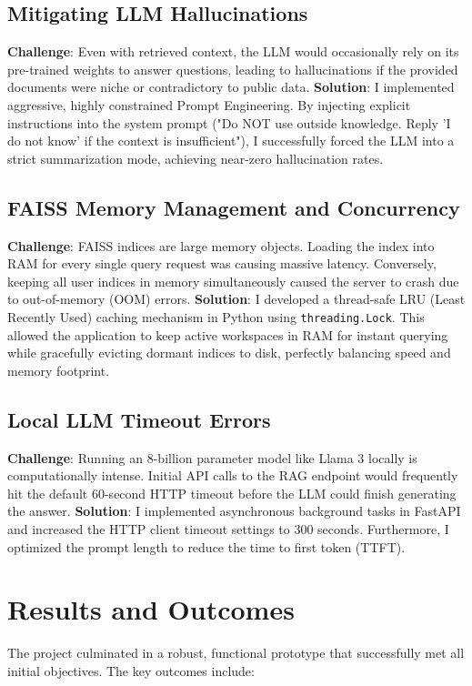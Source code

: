 \documentclass[12pt, a4paper]{report}
\begin{document}
\section{Mitigating LLM Hallucinations}
\textbf{Challenge}: Even with retrieved context, the LLM would occasionally rely on its pre-trained weights to answer questions, leading to hallucinations if the provided documents were niche or contradictory to public data.
\textbf{Solution}: I implemented aggressive, highly constrained Prompt Engineering. By injecting explicit instructions into the system prompt ("Do NOT use outside knowledge. Reply 'I do not know' if the context is insufficient"), I successfully forced the LLM into a strict summarization mode, achieving near-zero hallucination rates.

\section{FAISS Memory Management and Concurrency}
\textbf{Challenge}: FAISS indices are large memory objects. Loading the index into RAM for every single query request was causing massive latency. Conversely, keeping all user indices in memory simultaneously caused the server to crash due to out-of-memory (OOM) errors.
\textbf{Solution}: I developed a thread-safe LRU (Least Recently Used) caching mechanism in Python using \texttt{threading.Lock}. This allowed the application to keep active workspaces in RAM for instant querying while gracefully evicting dormant indices to disk, perfectly balancing speed and memory footprint.

\section{Local LLM Timeout Errors}
\textbf{Challenge}: Running an 8-billion parameter model like Llama 3 locally is computationally intense. Initial API calls to the RAG endpoint would frequently hit the default 60-second HTTP timeout before the LLM could finish generating the answer.
\textbf{Solution}: I implemented asynchronous background tasks in FastAPI and increased the HTTP client timeout settings to 300 seconds. Furthermore, I optimized the prompt length to reduce the time to first token (TTFT).

\chapter{Results and Outcomes}

The project culminated in a robust, functional prototype that successfully met all initial objectives. The key outcomes include:
\end{document}
